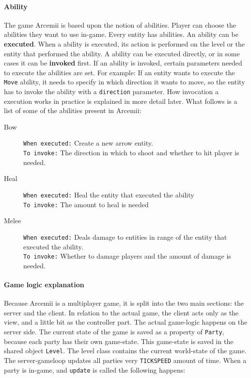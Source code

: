 \documentclass[../main.tex]{subfiles}
\begin{document}
        \paragraph{Ability}
        The game Arcemii is based upon the notion of abilities. Player can choose the abilities they want to use in-game. Every entity has abilities. An ability can be \textbf{executed}. When a ability is executed, its action is performed on the level or the entity that performed the ability. A ability can be executed directly, or in some cases it can be \textbf{invoked} first. If an ability is invoked, certain parameters needed to execute the abilities are set. For example: If an entity wants to execute the \texttt{Move} ability, it needs to specify in which direction it wants to move, so the entity has to invoke the ability with a \texttt{direction} parameter. How invocation a execution works in practice is explained in more detail later. What follows is a list of some of the abilities present in Arcemii:
        \begin{description}
            \item[Bow] \texttt{When executed:} Create a new arrow entity. \\
            \texttt{To invoke:} The direction in which to shoot and whether to hit player is needed.
            \item[Heal] \texttt{When executed:} Heal the entity that executed the ability \\
            \texttt{To invoke:} The amount to heal is needed
            \item[Melee] \texttt{When executed:} Deals damage to entities in range of the entity that executed the ability.\\
            \texttt{To invoke:} Whether to damage players and the amount of damage is needed.
        \end{description}

        \paragraph{Game logic explanation}
        Because Arcemii is a multiplayer game, it is split into the two main sections: the server and the client. In relation to the actual game, the client acts only as the view, and a little bit as the controller part. The actual game-logic happens on the server side. The current state of the game is saved as a property of \texttt{Party}, because each party has their own game-state. This game-state is saved in the shared object \texttt{Level}. The level class contains the current world-state of the game. The server-gameloop updates all parties very \texttt{TICKSPEED} amount of time. When a party is in-game, and \texttt{update} is called the following happens:
\end{document}
